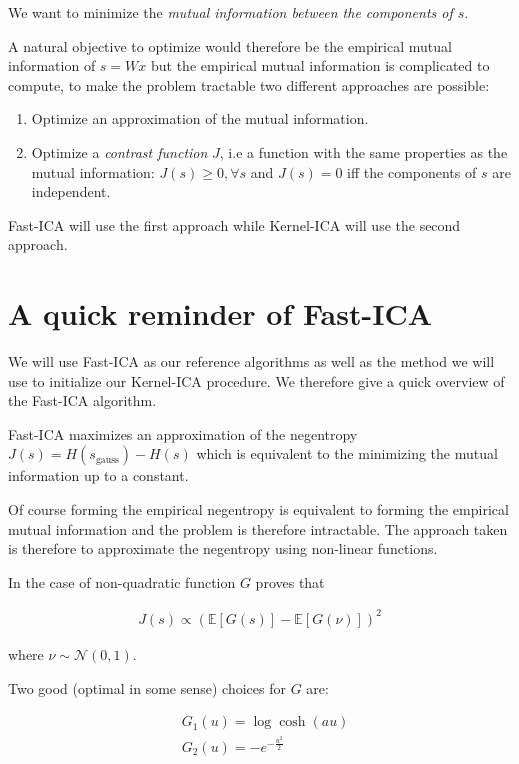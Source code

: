 \documentclass[a4paper,BCOR=5mm,oneside,openany]{scrreprt}
\begin{document}
We want to minimize the \emph{mutual information between the components of $s$}.

A natural objective to optimize would therefore be the empirical mutual information of $s = W x$ but the empirical mutual information is complicated to compute, to make the problem tractable two different approaches are possible:

\begin{enumerate}
	\item Optimize an approximation of the mutual information.
	\item Optimize a \emph{contrast function} $J$, i.e a function with the same properties as the mutual information: $J(s) \geq 0, \forall s$ and $J(s) = 0$ iff the components of $s$ are independent.
\end{enumerate}

Fast-ICA will use the first approach while Kernel-ICA will use the second approach.

\chapter{A quick reminder of Fast-ICA}

We will use Fast-ICA as our reference algorithms as well as the method we will use to initialize our Kernel-ICA procedure. We therefore give a quick overview of the Fast-ICA algorithm.

Fast-ICA maximizes an approximation of the negentropy $J(s) = H(s_\text{gauss}) − H(s)$ which is equivalent to the minimizing the mutual information up to a constant.

Of course forming the empirical negentropy is equivalent to forming the empirical mutual information and the problem is therefore intractable. The approach taken is therefore to approximate the negentropy using non-linear functions.

In the case of non-quadratic function $G$ \cite{Hyvarinen1998} proves that 

\begin{align*}
	J(s) \propto \left( \mathbb{E} \left[G(s) \right] − \mathbb{E} \left[ G(\nu) \right] \right)^2
\end{align*}

where $\nu \sim \mathcal{N}(0,1)$.

Two good (optimal in some sense) choices for $G$ are:

\begin{align*}
	&G_1 (u) = \log \cosh (a u) \\
	&G_2 (u) = −e^{-\frac{u^2}{2}}
\end{align*}
\end{document}

